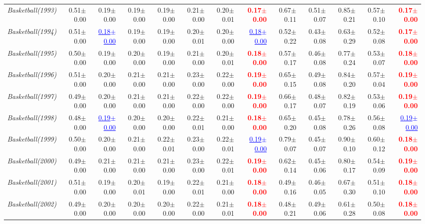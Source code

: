 \documentclass[nohyperref]{article}
\theoremstyle{plain}
\theoremstyle{definition}
\theoremstyle{remark}
\newcommand{\red}[1]{\textcolor{red}{\textbf{#1}}}
\newcommand{\blue}[1]{\textcolor{blue}{\underline{#1}}}
\begin{document}
\begin{table*}[!ht]
{\begin{tabular}{lrr|rrrrr|rrrrr}
			{\it Basketball(1993)} & 0.51$\pm$0.00 & 0.19$\pm$0.00 & 0.19$\pm$0.00 & 0.19$\pm$0.00 & 0.21$\pm$0.00 & 0.20$\pm$0.01 & \red{0.17$\pm$0.00} & 0.67$\pm$0.11 & 0.51$\pm$0.07 & 0.85$\pm$0.21 & 0.57$\pm$0.10 & \red{0.17$\pm$0.00} \\
			{\it Basketball(1994)} & 0.51$\pm$0.00 & \blue{0.18$\pm$0.00} & 0.19$\pm$0.00 & 0.19$\pm$0.00 & 0.20$\pm$0.01 & 0.20$\pm$0.00 & \blue{0.18$\pm$0.00} & 0.52$\pm$0.22 & 0.43$\pm$0.08 & 0.63$\pm$0.29 & 0.52$\pm$0.08 & \red{0.17$\pm$0.00} \\
			{\it Basketball(1995)} & 0.50$\pm$0.00 & 0.19$\pm$0.00 & 0.20$\pm$0.00 & 0.19$\pm$0.00 & 0.21$\pm$0.00 & 0.20$\pm$0.01 & \red{0.18$\pm$0.00} & 0.57$\pm$0.17 & 0.46$\pm$0.08 & 0.77$\pm$0.24 & 0.53$\pm$0.07 & \red{0.18$\pm$0.00} \\
			{\it Basketball(1996)} & 0.51$\pm$0.00 & 0.20$\pm$0.00 & 0.21$\pm$0.00 & 0.21$\pm$0.00 & 0.23$\pm$0.00 & 0.22$\pm$0.00 & \red{0.19$\pm$0.00} & 0.65$\pm$0.15 & 0.49$\pm$0.08 & 0.84$\pm$0.20 & 0.57$\pm$0.04 & \red{0.19$\pm$0.00} \\
			{\it Basketball(1997)} & 0.49$\pm$0.00 & 0.20$\pm$0.00 & 0.21$\pm$0.00 & 0.21$\pm$0.00 & 0.22$\pm$0.00 & 0.22$\pm$0.00 & \red{0.19$\pm$0.00} & 0.66$\pm$0.17 & 0.48$\pm$0.07 & 0.82$\pm$0.19 & 0.53$\pm$0.06 & \red{0.19$\pm$0.00} \\
			{\it Basketball(1998)} & 0.48$\pm$0.00 & \blue{0.19$\pm$0.00} & 0.20$\pm$0.00 & 0.20$\pm$0.00 & 0.22$\pm$0.01 & 0.21$\pm$0.00 & \red{0.18$\pm$0.00} & 0.65$\pm$0.20 & 0.45$\pm$0.08 & 0.78$\pm$0.26 & 0.56$\pm$0.08 & \blue{0.19$\pm$0.00} \\
			{\it Basketball(1999)} & 0.50$\pm$0.00 & 0.20$\pm$0.00 & 0.21$\pm$0.00 & 0.22$\pm$0.01 & 0.23$\pm$0.00 & 0.22$\pm$0.01 & \blue{0.19$\pm$0.00} & 0.79$\pm$0.07 & 0.45$\pm$0.07 & 0.90$\pm$0.10 & 0.60$\pm$0.12 & \red{0.18$\pm$0.00} \\
			{\it Basketball(2000)} & 0.49$\pm$0.00 & 0.21$\pm$0.00 & 0.21$\pm$0.00 & 0.21$\pm$0.00 & 0.23$\pm$0.00 & 0.22$\pm$0.01 & \red{0.19$\pm$0.00} & 0.62$\pm$0.14 & 0.45$\pm$0.06 & 0.80$\pm$0.17 & 0.54$\pm$0.09 & \red{0.19$\pm$0.00} \\
			{\it Basketball(2001)} & 0.51$\pm$0.00 & 0.19$\pm$0.00 & 0.20$\pm$0.01 & 0.19$\pm$0.00 & 0.22$\pm$0.01 & 0.21$\pm$0.00 & \red{0.18$\pm$0.00} & 0.49$\pm$0.16 & 0.46$\pm$0.05 & 0.67$\pm$0.30 & 0.51$\pm$0.10 & \red{0.18$\pm$0.00} \\
			{\it Basketball(2002)} & 0.49$\pm$0.00 & 0.20$\pm$0.00 & 0.20$\pm$0.00 & 0.20$\pm$0.00 & 0.22$\pm$0.00 & 0.21$\pm$0.01 & \red{0.18$\pm$0.00} & 0.48$\pm$0.21 & 0.49$\pm$0.06 & 0.61$\pm$0.28 & 0.50$\pm$0.08 & \red{0.18$\pm$0.00} \\

\end{tabular}}
\end{table*}
\end{document}
